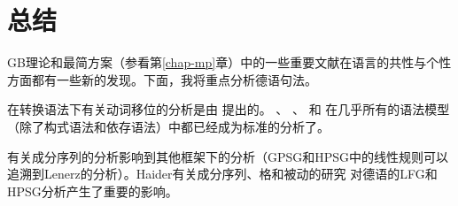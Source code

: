 \section{总结}
\label{sec-summary-gb}

GB理论和最简方案（参看第\ref{chap-mp}章）中的一些重要文献在语言的共性与个性方面都有一些新的发现。下面，我将重点分析德语句法。

在转换语法下有关动词移位的分析是由 \citet*[]{Bierwisch63}提出的。 \citet{Reis74a}、 \citet{Koster75a}、 \citet[\S~1]{Thiersch78a}和 \citet{denBesten83a}在几乎所有的语法模型（除了构式语法\indexcxgc 和依存语法\indexdgc）中都已经成为标准的分析了。

 \citet{Lenerz77}有关成分序列的分析影响到其他框架下的分析（GPSG和HPSG中的线性规则可以追溯到Lenerz的分析）。Hai\-der有关成分序列、格和被动的研究\citeyearpar{Haider84b,Haider85,Haider85b,Haider86,Haider90a,Haider93a} 对德语的LFG和HPSG分析产生了重要的影响。

